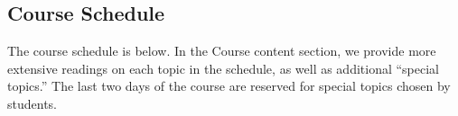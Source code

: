 \documentclass[12pt]{article}
\begin{document}

\newpage
\begin{landscape}
\section*{Course Schedule}\label{sec:schedule}

The course schedule is below. In the Course content section, we provide more extensive readings on each topic in the schedule, as well as additional ``special topics.'' The last two days of the course are reserved for special topics chosen by students.


\end{landscape}
\end{document}
